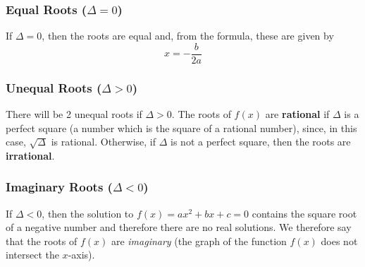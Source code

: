 {\subsubsection*{Equal Roots ($\Delta = 0$)}
If $\Delta = 0$, then the roots are equal and, from the formula, these
are given by
\begin{equation}
x = -\frac{b}{2a}
\end{equation}

\subsubsection*{Unequal Roots ($\Delta > 0$)}
There will be 2 unequal roots if $\Delta > 0$. The roots of $f(x)$ are \textbf{rational} if $\Delta$ is a perfect square (a number which is the square of a rational number), since, in this case, $\sqrt{\Delta}$ is rational. Otherwise, if $\Delta$ is not a perfect square, then the roots are \textbf{irrational}.

\subsubsection*{Imaginary Roots ($\Delta < 0$)}
If $\Delta < 0$, then the solution to $f(x) = ax^{2} + bx + c = 0$ contains the square root of a negative number and therefore there are no real solutions. We therefore say that the roots of $f(x)$ are \emph{imaginary} (the graph of the function $f(x)$ does not intersect the $x$-axis).
}
